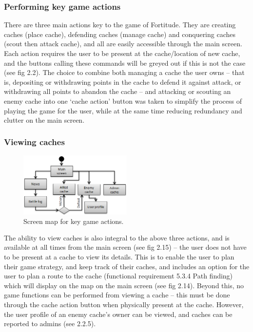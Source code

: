 \newpage
\subsubsection{Performing key game actions}

There are three main actions key to the game of Fortitude. They are creating caches (place cache), defending caches (manage cache) and conquering caches (scout then attack cache), and all are easily accessible through the main screen. Each action requires the user to be present at the cache/location of new cache, and the buttons calling these commands will be greyed out if this is not the case (see fig 2.2). The choice to combine both managing a cache the user owns – that is, depositing or withdrawing points in the cache to defend it against attack, or withdrawing all points to abandon the cache – and attacking or scouting an enemy cache into one ‘cache action’ button was taken to simplify the process of playing the game for the user, while at the same time reducing redundancy and clutter on the main screen.

\subsubsection{Viewing caches}

\begin{figure}
	\vspace{-85pt}
	\begin{center}
	\includegraphics[width=0.5\textwidth]{images/viewing_caches}
	\caption{Screen map for key game actions.}
	\label{viewing_caches}
	\vspace{-10pt}
	\end{center}
\end{figure}
The ability to view caches is also integral to the above three actions, and is available at all times from the main screen (see fig 2.15) – the user does not have to be present at a cache to view its details. This is to enable the user to plan their game strategy, and keep track of their caches, and includes an option for the user to plan a route to the cache (functional requirement 5.3.4 Path finding) which will display on the map on the main screen (see fig 2.14). Beyond this, no game functions can be performed from viewing a cache – this must be done through the cache action button when physically present at the cache. However, the user profile of an enemy cache’s owner can be viewed, and caches can be reported to admins (see 2.2.5).

